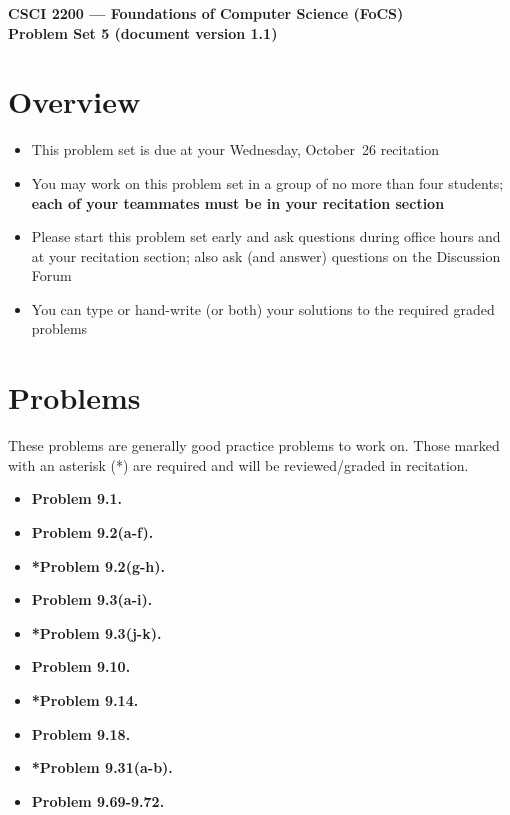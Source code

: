 \documentclass[11pt]{article}
\begin{document}
\thispagestyle{empty}

\begin{center}
\large
\textbf{CSCI 2200 --- Foundations of Computer Science (FoCS) \\
Problem Set 5 (document version 1.1)}
\end{center}

\section*{Overview}
\begin{itemize}
\item This problem set is due at your Wednesday, October~26 recitation
\item You may work on this problem set in a group of no more than four students;
  \textbf{each of your teammates must be in your recitation section}
\item Please start this problem set early and ask questions during
  office hours and at your recitation section;
  also ask (and answer) questions on the Discussion Forum 
\item You can type or hand-write (or both) your solutions
  to the required graded problems
\end{itemize}

\section*{Problems}
These problems are generally good practice problems to work on.
Those marked with an asterisk (*) are required and will be reviewed/graded
in recitation.

\begin{multicols}{2}
\begin{itemize}

\item \textbf{Problem 9.1.}
\item \textbf{Problem 9.2(a-f).}
\item \textbf{*Problem 9.2(g-h).}
\item \textbf{Problem 9.3(a-i).}
\item \textbf{*Problem 9.3(j-k).}
\item \textbf{Problem 9.10.}
\item \textbf{*Problem 9.14.}
\item \textbf{Problem 9.18.}
\item \textbf{*Problem 9.31(a-b).}
\item \textbf{Problem 9.69-9.72.}

\end{itemize}
\end{multicols}
\end{document}
